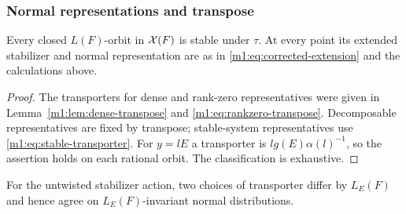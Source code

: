 \subsubsection{Normal representations and transpose}\label{m1:subsec:normal-interface}
\begin{corollary}\label{m1:cor:transpose-stable}
Every closed $L(F)$-orbit in $\mathcal X(F)$ is stable under $\tau$. At every
point its extended stabilizer and normal representation are as in
\eqref{m1:eq:corrected-extension} and the calculations above.
\end{corollary}
\begin{proof}
The transporters for dense and rank-zero representatives were given in
Lemma~\ref{m1:lem:dense-transpose} and \eqref{m1:eq:rankzero-transpose}.
Decomposable representatives are fixed by transpose; stable-system
representatives use \eqref{m1:eq:stable-transporter}. For $y=lE$ a
transporter is $l g(E)\alpha(l)^{-1}$, so the assertion holds on each
rational orbit. The classification is exhaustive.
\end{proof}
For the untwisted stabilizer action, two choices of transporter differ
by $L_E(F)$ and hence agree on $L_E(F)$-invariant normal distributions.

